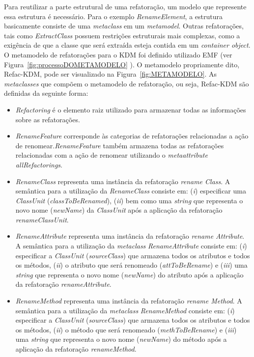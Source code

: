 Para reutilizar a parte estrutural de uma refatoração, um modelo que represente essa estrutura é necessário. Para o exemplo \textit{RenameElement}, a estrutura basicamente consiste de uma \textit{metaclass} em um \textit{metamodel}. Outras refatorações, tais como \textit{ExtractClass} possuem restrições estruturais mais complexas, como a exigência de que a classe que será extraída esteja contida em um \textit{container object}. O metamodelo de refatorações para o KDM foi definido utilizado EMF (ver Figura~\ref{fig:processoDOMETAMODELO} ). O metamodelo propriamente dito, Refac-KDM, pode ser visualizado na Figura~\ref{fig:METAMODELO}. As \textit{metaclasses} que compõem o metamodelo de refatoração, ou seja, Refac-KDM são definidas da seguinte forma:
 
\begin{itemize}

\item \textit{Refactoring} é o elemento raiz utilizado para armazenar todas as informações sobre as refatorações.

\item \textit{RenameFeature} corresponde às categorias de refatorações relacionadas a ação de renomear.\textit{RenameFeature} também armazena todas as refatorações relacionadas com a ação de renomear utilizando o \textit{metaattribute} \textit{allRefactorings}.

\item \textit{RenameClass} representa uma instância da refatoração \textit{rename Class}.  A semântica para a utilização da \textit{RenameClass} consiste em: (\textit{i}) especificar uma \textit{ClassUnit} (\textit{classToBeRenamed}), (\textit{ii}) bem como uma \textit{string} que representa o novo nome (\textit{newName}) da \textit{ClassUnit} após a aplicação da refatoração \textit{renameClassUnit}.

\item \textit{RenameAttribute} representa uma instância da refatoração \textit{rename Attribute}. A semântica para a utilização da \textit{metaclass} \textit{RenameAttribute} consiste em: (\textit{i}) especificar a \textit{ClassUnit} (\textit{sourceClass}) que armazena todos os atributos e todos os métodos, (\textit{ii}) o atributo que será renomeado (\textit{attToBeRename}) e (\textit{iii}) uma \textit{string} que representa o novo nome (\textit{newName}) do atributo após a aplicação da refatoração \textit{renameAttribute}.

\item \textit{RenameMethod} representa uma instância da refatoração \textit{rename Method}. A semântica para a utilização da \textit{metaclass} \textit{RenameMethod} consiste em: (\textit{i}) especificar a \textit{ClassUnit} (\textit{sourceClass}) que armazena todos os atributos e todos os métodos, (\textit{ii}) o método que será renomeado (\textit{methToBeRename}) e (\textit{iii}) uma \textit{string} que representa o novo nome (\textit{newName}) do método após a aplicação da refatoração \textit{renameMethod}.


\end{itemize}
